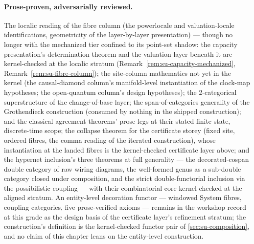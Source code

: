 \paragraph{Prose-proven, adversarially reviewed.} The localic
reading of the fibre column (the powerlocale and valuation-locale
identifications, geometricity of the layer-by-layer presentation)
--- though no longer with the mechanized tier confined to its
point-set shadow: the capacity presentation's determination theorem
and the valuation layer beneath it are kernel-checked at the localic
stratum (Remark~\ref{rem:su-capacity-mechanized},
Remark~\ref{rem:su-fibre-column});
the site-column mathematics not yet in the kernel (the
causal-diamond column's manifold-level instantiation of the
clock-map hypotheses; the open-quantum column's design hypotheses);
the
2-categorical superstructure of the change-of-base layer; the
span-of-categories generality of the Grothendieck construction
(consumed by nothing in the shipped construction); and the classical
agreement theorems' prose legs at their stated finite-state,
discrete-time scope; the collapse theorem for the certificate
storey (fixed site, ordered fibres, the comma reading of the
iterated construction), whose instantiation at the landed fibres is
the kernel-checked certificate layer above; and the hypernet
inclusion's three theorems at full generality --- the
decorated-cospan double category of raw wiring diagrams, the
well-formed genus as a sub-double category closed under
composition, and the strict double-functorial inclusion via the
possibilistic coupling --- with their combinatorial core
kernel-checked at the aligned stratum. An entity-level decoration
functor --- windowed System fibres, coupling categories, five
prose-verified axioms --- remains in the workshop record at this
grade as the design basis of the certificate layer's refinement
stratum; the construction's definition is the kernel-checked
functor pair of \autoref{sec:su-composition}, and no claim
of this chapter leans on the entity-level construction.

